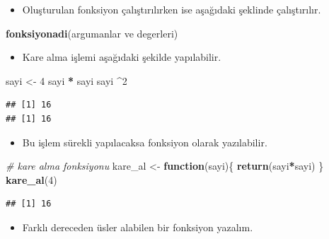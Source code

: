 \documentclass[
  oneside]{book}
\newenvironment{Shaded}{\begin{snugshade}}{\end{snugshade}}
\newcommand{\CommentTok}[1]{\textcolor[rgb]{0.56,0.35,0.01}{\textit{#1}}}
\newcommand{\ControlFlowTok}[1]{\textcolor[rgb]{0.13,0.29,0.53}{\textbf{#1}}}
\newcommand{\DecValTok}[1]{\textcolor[rgb]{0.00,0.00,0.81}{#1}}
\newcommand{\FunctionTok}[1]{\textcolor[rgb]{0.13,0.29,0.53}{\textbf{#1}}}
\newcommand{\NormalTok}[1]{#1}
\newcommand{\OtherTok}[1]{\textcolor[rgb]{0.56,0.35,0.01}{#1}}
\newcommand{\SpecialCharTok}[1]{\textcolor[rgb]{0.81,0.36,0.00}{\textbf{#1}}}
\providecommand{\tightlist}{%
  \setlength{\itemsep}{0pt}\setlength{\parskip}{0pt}}
\begin{document}
\begin{itemize}
\tightlist
\item
  Oluşturulan fonksiyon çalıştırılırken ise aşağıdaki şeklinde çalıştırılır.
\end{itemize}

\begin{Shaded}
\begin{Highlighting}[]
\FunctionTok{fonksiyonadi}\NormalTok{(argumanlar ve degerleri)}
\end{Highlighting}
\end{Shaded}

\begin{itemize}
\tightlist
\item
  Kare alma işlemi aşağıdaki şekilde yapılabilir.
\end{itemize}

\begin{Shaded}
\begin{Highlighting}[]
\NormalTok{sayi }\OtherTok{\textless{}{-}}  \DecValTok{4}
\NormalTok{sayi }\SpecialCharTok{*}\NormalTok{ sayi}
\NormalTok{sayi }\SpecialCharTok{\^{}}\DecValTok{2}
\end{Highlighting}
\end{Shaded}

\begin{verbatim}
## [1] 16
## [1] 16
\end{verbatim}

\begin{itemize}
\tightlist
\item
  Bu işlem sürekli yapılacaksa fonksiyon olarak yazılabilir.
\end{itemize}

\begin{Shaded}
\begin{Highlighting}[]
\CommentTok{\# kare alma fonksiyonu}
\NormalTok{kare\_al }\OtherTok{\textless{}{-}}  \ControlFlowTok{function}\NormalTok{(sayi)\{}
  \FunctionTok{return}\NormalTok{(sayi}\SpecialCharTok{*}\NormalTok{sayi)}
\NormalTok{  \}}
\FunctionTok{kare\_al}\NormalTok{(}\DecValTok{4}\NormalTok{)}
\end{Highlighting}
\end{Shaded}

\begin{verbatim}
## [1] 16
\end{verbatim}

\begin{itemize}
\tightlist
\item
  Farklı dereceden üsler alabilen bir fonksiyon yazalım.
\end{itemize}
\end{document}
